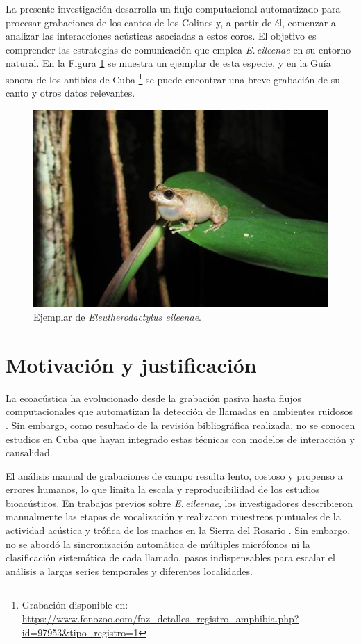 La presente investigación desarrolla un flujo computacional automatizado para 
procesar grabaciones de los cantos de los Colines y, a partir de él, comenzar a analizar 
 las interacciones acústicas asociadas a estos coros. 
El objetivo es comprender las 
estrategias de comunicación que emplea \emph{E.\,eileenae} en su entorno natural.
En la Figura \ref{fig:colin} se muestra un ejemplar de esta especie, y en la
Guía sonora de los anfibios de Cuba 
\footnote{Grabación disponible en: \url{https://www.fonozoo.com/fnz_detalles_registro_amphibia.php?id=97953&tipo_registro=1}}
se puede encontrar una breve grabación de su canto y otros datos relevantes.\\

\begin{figure}[h!]
    \centering
    \includegraphics[width=\columnwidth]{Graphics/colin.jpg}
    \caption{Ejemplar de \emph{Eleutherodactylus eileenae}.}
    \label{fig:colin}
\end{figure}


\section{Motivación y justificación}
\label{sec:motivacion_justificacion}

La ecoacústica ha evolucionado desde la grabación pasiva hasta flujos computacionales 
que automatizan la detección de llamadas en ambientes ruidosos 
\cite{acevedo2009automated,blumstein2011acoustic}. Sin embargo, 
como resultado de la revisión bibliográfica realizada, no se conocen
estudios en Cuba que   
hayan integrado estas técnicas con modelos de interacción y causalidad.

El análisis manual de grabaciones de campo resulta lento, 
costoso y propenso a errores humanos, lo que limita la escala y 
reproducibilidad de los estudios bioacústicos. En trabajos 
previos sobre \emph{E.\,eileenae}, los investigadores 
describieron manualmente las etapas de vocalización y 
realizaron muestreos puntuales de la actividad acústica y 
trófica de los machos en la Sierra del Rosario \cite{alonso2001patrones}. 
Sin embargo, no se abordó la sincronización automática de 
múltiples micrófonos ni la clasificación sistemática de cada 
llamado, pasos indispensables para escalar el análisis a largas 
series temporales y diferentes localidades.

